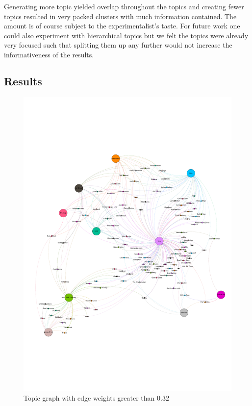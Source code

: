\documentclass[10pt,a4paper]{article}
\begin{document}
	Generating more topic yielded overlap throughout the topics and creating fewer topics resulted in very packed clusters with much information contained. The amount is of course subject to the experimentalist's taste. For future work one could also experiment with hierarchical topics but we felt the topics were already very focused such that splitting them up any further would not increase the informativeness of the results.
	
		\subsection{Results}
		
		\begin{figure}[htb]
			\centering
			\includegraphics[trim=0mm 50mm 0mm 50mm, clip, width=\linewidth]{data/topic_graph}
			\caption{Topic graph with edge weights greater than $0.32$}
			\label{fig:topicgraph}
		\end{figure}
		
\end{document}
